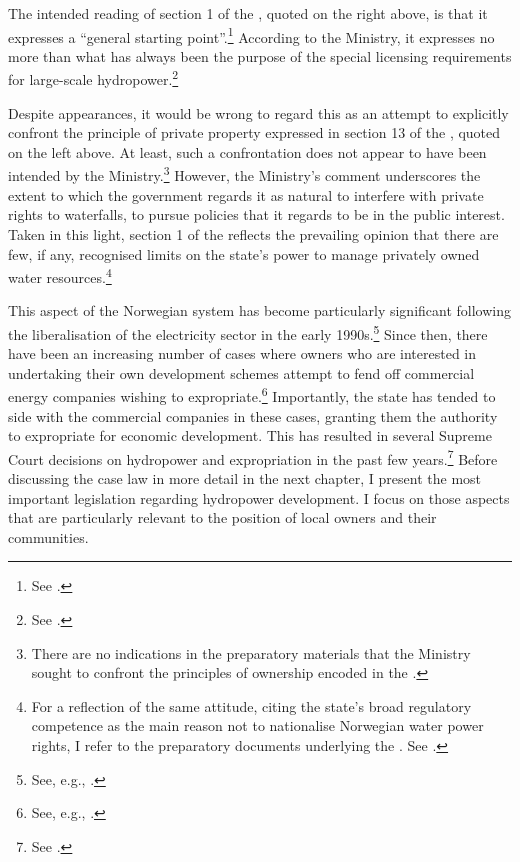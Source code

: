 The intended reading of section 1 of the \cite{ica17}, quoted on the right above, is that it expresses a ``general starting point''.\footnote{See \cite[72]{otprp61}.} According to the Ministry, it expresses no more than what has always been the purpose of the special licensing requirements for large-scale hydropower.\footnote{See \cite[72]{otprp61}.}

Despite appearances, it would be wrong to regard this as an attempt to explicitly confront the principle of private property expressed in section 13 of the \cite{wra00}, quoted on the left above. At least, such a confrontation does not appear to have been intended by the Ministry.\footnote{There are no indications in the preparatory materials that the Ministry sought to confront the principles of ownership encoded in the \cite{wra00}.} However, the Ministry's comment underscores the extent to which the government regards it as natural to interfere with private rights to waterfalls, to pursue policies that it regards to be in the public interest. Taken in this light, section 1 of the \cite{ica17} reflects the prevailing opinion that there are few, if any, recognised limits on the state's power to manage privately owned water resources.\footnote{For a reflection of the same attitude, citing the state's broad regulatory competence as the main reason not 
to nationalise Norwegian water power rights, I refer to the preparatory documents underlying the \cite{wra00}. See \cite[152-153]{nou94}.}

This aspect of the Norwegian system has become particularly significant following the liberalisation of the electricity sector in the early 1990s.\footnote{See, e.g., \cite{larsen06}.} Since then, there have been an increasing number of cases where owners who are interested in undertaking their own development schemes attempt to fend off commercial energy companies wishing to expropriate.\footnote{See, e.g., \cite{sofienlund07}.} Importantly, the state has tended to side with the commercial companies in these cases, granting them the authority to expropriate for economic development. This has resulted in several Supreme Court decisions on hydropower and expropriation in the past few years.\footnote{See \cite{uleberg08,otra10,jorpeland11,klovtveit11,otra13}.} Before discussing the case law in more detail in the next chapter, I present the most important legislation regarding hydropower development. I focus on those aspects that are particularly relevant to the position of local owners and their communities.


